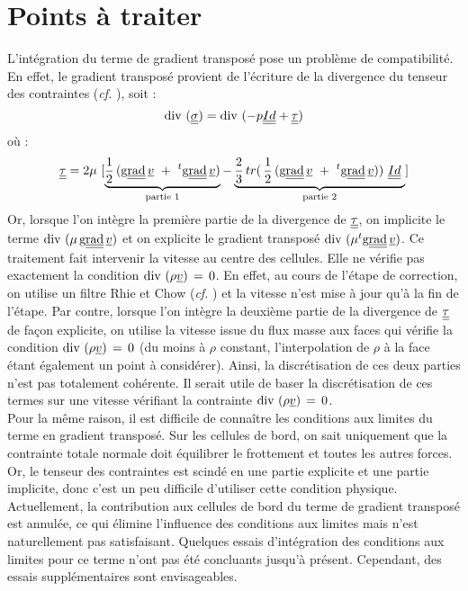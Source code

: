 \section*{Points \`a traiter} \label{Base_Visecv_paragraphe4}
L'intégration du terme de gradient transposé pose un problème de compatibilité.
En effet, le gradient transposé provient de l'écriture de la divergence
du tenseur des contraintes (\emph{cf.} ), soit :
\begin{equation}\notag
\text{div}\,\,(\underline{\underline{\sigma}}) = \text{div}\,\,(- p \underline{\underline{Id}} + \underline{\underline{\tau }})
\end{equation}
où :
\begin{equation}\notag
\underline{\underline{\tau}} = 2 \mu\ [\underbrace{\displaystyle \frac{1}{2}\,(\text{g}\underline{\underline{{\text{rad}}}}\, \underline
{v}\ +\ ^t\text{g}\underline{\underline{{\text{rad}}}}\, \underline {v})}_{\text{partie 1}} -\underbrace{\displaystyle \frac{2}{3}\,tr(\,\frac{1}{2}\,(\text{g}\underline{\underline{{\text{rad}}}}\, \underline
{v}\ +\ ^t\text{g}\underline{\underline{{\text{rad}}}}\, \underline {v}))\ \underline{\underline{Id}}\ }_{\text{partie 2}}]
\end{equation}
Or, lorsque l'on intègre la première partie de la divergence de
$\underline{\underline{\tau}}$, on implicite le terme $\text{div}\,\,(\mu\,\text{g}\underline{\underline{{\text{rad}}}}\, \underline{v})$ et on
explicite le gradient transposé $\text{div}\,\,(\mu ^t\text{g}\underline{\underline{{\text{rad}}}}\, \underline{v})$.
 Ce traitement fait intervenir la vitesse au centre des cellules. Elle ne
vérifie pas exactement la condition $\text{div}\,\,(\rho \underline{v})\,=\,0$. En
effet, au cours de l'étape de correction, on utilise un filtre Rhie et Chow
(\emph{cf.} ) et la vitesse n'est mise à jour qu'à la fin de
l'étape. Par contre, lorsque l'on intègre la deuxième partie de
la divergence de $\underline{\underline{\tau}}$ de façon explicite, on utilise
la vitesse issue du flux masse aux faces qui vérifie la condition $\text{div}\,\,(\rho
\underline{v})\,=\,0$ (du moins à $\rho$ constant, l'interpolation de $\rho$ à
la face étant également un point à considérer). Ainsi, la discrétisation de ces
deux parties n'est pas totalement cohérente. Il serait utile de baser la
discrétisation de ces termes sur une vitesse vérifiant la contrainte
$\text{div}\,\,(\rho \underline{v})\,=\,0$.\\
Pour la même raison, il est difficile de connaître les conditions aux limites du
terme en gradient transposé. Sur les cellules de bord, on sait uniquement que la
contrainte totale normale doit équilibrer le frottement et toutes les autres
forces. Or, le tenseur des contraintes est scindé en une partie explicite et une partie implicite, donc c'est un peu difficile d'utiliser cette condition physique.\\
Actuellement, la contribution aux cellules de bord du terme de gradient transposé est
annulée, ce qui élimine l'influence des conditions aux limites mais n'est naturellement pas satisfaisant. Quelques essais d'intégration des conditions aux limites pour ce terme n'ont pas été concluants jusqu'à présent. Cependant, des essais supplémentaires
sont envisageables.
